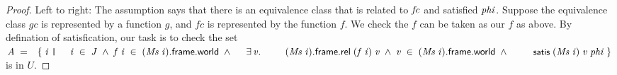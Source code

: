 \documentclass[letterpaper]{article}
\renewcommand{\HOLConst}[1]{{\textsf{\upshape\small #1}}}
\renewcommand{\HOLinline}[1]{\ensuremath{#1}}
\begin{document}
\begin{proof}
Left to right: The assumption says that there is an equivalence class that is related to \HOLinline{\HOLFreeVar{fc}} and satisfied \HOLinline{\HOLFreeVar{phi}}. Suppose the equivalence class $gc$ is represented by a function $g$, and $fc$ is represented by the function $f$. We check the $f$ can be taken as our $f$ as above. By defination of satisfication, our task is to check the set \HOLinline{\HOLFreeVar{A}\;\HOLSymConst{=}\\
\;\;\HOLTokenLeftbrace{}\HOLBoundVar{i}\;\HOLTokenBar{}\\
\;\;\;\;\;\HOLBoundVar{i}\;\HOLSymConst{\HOLTokenIn{}}\;\HOLFreeVar{J}\;\HOLSymConst{\HOLTokenConj{}}\;\HOLFreeVar{f}\;\HOLBoundVar{i}\;\HOLSymConst{\HOLTokenIn{}}\;(\HOLFreeVar{Ms}\;\HOLBoundVar{i}).\HOLFieldName{frame}.\HOLFieldName{world}\;\HOLSymConst{\HOLTokenConj{}}\\
\;\;\;\;\;\HOLSymConst{\HOLTokenExists{}}\HOLBoundVar{v}.\\
\;\;\;\;\;\;\;\;\;(\HOLFreeVar{Ms}\;\HOLBoundVar{i}).\HOLFieldName{frame}.\HOLFieldName{rel}\;(\HOLFreeVar{f}\;\HOLBoundVar{i})\;\HOLBoundVar{v}\;\HOLSymConst{\HOLTokenConj{}}\;\HOLBoundVar{v}\;\HOLSymConst{\HOLTokenIn{}}\;(\HOLFreeVar{Ms}\;\HOLBoundVar{i}).\HOLFieldName{frame}.\HOLFieldName{world}\;\HOLSymConst{\HOLTokenConj{}}\\
\;\;\;\;\;\;\;\;\;\HOLConst{satis}\;(\HOLFreeVar{Ms}\;\HOLBoundVar{i})\;\HOLBoundVar{v}\;\HOLFreeVar{phi}\HOLTokenRightbrace{}} is in $U$. 


\end{proof}
\end{document}
